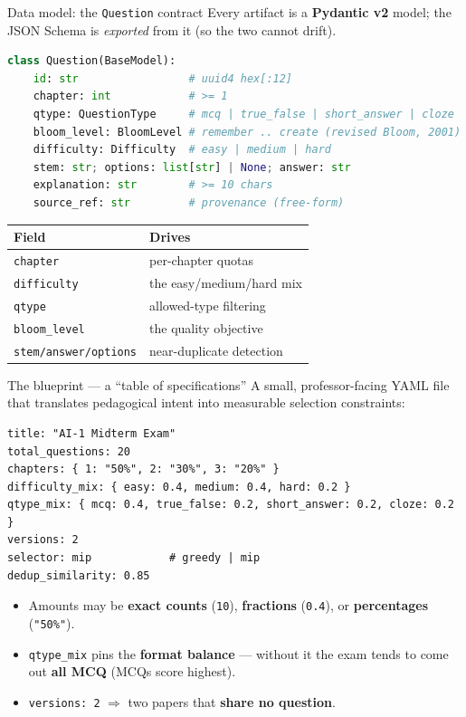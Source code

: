 \documentclass[11pt,aspectratio=169]{beamer}
\newcommand{\code}[1]{\texttt{\small #1}}
\begin{document}
\begin{frame}[fragile]{Data model: the \texttt{Question} contract}
  Every artifact is a \textbf{Pydantic v2} model; the JSON Schema is
  \emph{exported} from it (so the two cannot drift).
\begin{lstlisting}[language=Python]
class Question(BaseModel):
    id: str                 # uuid4 hex[:12]
    chapter: int            # >= 1
    qtype: QuestionType     # mcq | true_false | short_answer | cloze
    bloom_level: BloomLevel # remember .. create (revised Bloom, 2001)
    difficulty: Difficulty  # easy | medium | hard
    stem: str; options: list[str] | None; answer: str
    explanation: str        # >= 10 chars
    source_ref: str         # provenance (free-form)
\end{lstlisting}
  \vspace{-1mm}
  \begin{center}\footnotesize
  \begin{tabular}{@{}ll@{}}
    \toprule
    \textbf{Field} & \textbf{Drives} \\
    \midrule
    \code{chapter} & per-chapter quotas \\
    \code{difficulty} & the easy/medium/hard mix \\
    \code{qtype} & allowed-type filtering \\
    \code{bloom\_level} & the quality objective \\
    \code{stem/answer/options} & near-duplicate detection \\
    \bottomrule
  \end{tabular}
  \end{center}
\end{frame}

\begin{frame}[fragile]{The blueprint — a ``table of specifications''}
  A small, professor-facing YAML file that translates pedagogical intent into
  measurable selection constraints:
\begin{lstlisting}
title: "AI-1 Midterm Exam"
total_questions: 20
chapters: { 1: "50%", 2: "30%", 3: "20%" }
difficulty_mix: { easy: 0.4, medium: 0.4, hard: 0.2 }
qtype_mix: { mcq: 0.4, true_false: 0.2, short_answer: 0.2, cloze: 0.2 }
versions: 2
selector: mip            # greedy | mip
dedup_similarity: 0.85
\end{lstlisting}
  \begin{itemize}
    \item Amounts may be \textbf{exact counts} (\code{10}), \textbf{fractions}
          (\code{0.4}), or \textbf{percentages} (\code{"50\%"}).
    \item \code{qtype\_mix} pins the \textbf{format balance} — without it the
          exam tends to come out \textbf{all MCQ} (MCQs score highest).
    \item \code{versions: 2} $\Rightarrow$ two papers that \textbf{share no question}.
  \end{itemize}
\end{frame}
\end{document}

